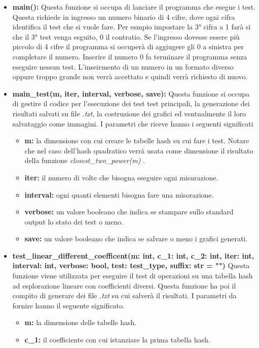 \documentclass{article}
\newcommand{\newlineitem}[1]{\item \textbf{#1} \hfill \break}
\begin{document}
\begin{itemize}
\newlineitem{main():}
Questa funzione si occupa di lanciare il programma che esegue i test. Questa richiede in ingresso un numero binario di 4 cifre, dove ogni cifra identifica il test che si vuole fare. Per esmpio impostare la 3° cifra a 1 farà si che il 3° test venga esguito, 0 il contratio. Se l'ingresso dovesse essere più piccolo di 4 cifre il programma si occuperà di aggiugere gli 0 a sinistra per completare il numero. Inserire il numero 0 fa terminare il programma senza eseguire nessun test. L'inseirmento di un numero in un formato diverso oppure troppo grande non verrà accettato e  quindi verrà richiesto di nuovo.
\newlineitem{main\_test(m, iter, interval, verbose, save):}
Questa funzione si occupa di gestire il codice per l'esecuzione dei test test principali, la generazione dei risultati salvati su file \emph{.txt}, la costruzione dei grafici ed ventualmente il loro salvataggio come immagini. I parametri che riceve hanno i seguenti significati
\begin{itemize}
\item \textbf{m:} la dimensione con cui creare le tabelle hash su cui fare i test. Notare che nel caso dell'hash quadratico verrà usata come dimensione il risultato della funzione \emph{closest\_two\_power(m)} .
\item \textbf{iter:} il numero di volte che bisogna eseguire ogni misurazione.
\item \textbf{interval:} ogni quanti elementi bisogna fare una misorazione.
\item \textbf{verbose:} un valore booleano che indica se stampare sullo standard output lo stato dei test o meno.
\item \textbf{save:} un valore booleano che indica se salvare o meno i grafici generati.
\end{itemize}
\newlineitem{test\_linear\_different\_coefficent(m: int, c\_1: int, c\_2: int, iter: int, interval: int, verbose: bool, test: test\_type, suffix: str = "")}
Questa funzione viene utilizzata per eseguire il test di operazioni su una tabella hash ad esplorazione lineare con coefficienti diversi. Questa funzione ha poi il compito di generare dei file \emph{.txt} su cui salverà il risultati. I parametri da fornire hanno il seguente significato.
\begin{itemize}
\item \textbf{m:} la dimensione delle tabelle hash.
\item \textbf{c\_1:} il coefficiente con cui istanziare la prima tabella hash.

\end{itemize}
\end{itemize}
\end{document}
